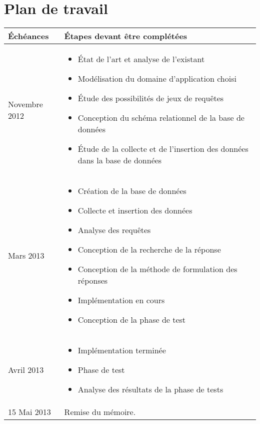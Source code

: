 \documentclass[a4paper,12pt]{article}
\begin{document}
\section{Plan de travail}
\begin{tabular}{p{4cm} p{9cm}}
  \toprule
  \large{Échéances} & \large{Étapes devant être complétées} \\
  \midrule
  \large{Novembre 2012} & \begin{itemize}
    \item État de l'art et analyse de l'existant
    \item Modélisation du domaine d'application choisi
    \item Étude des possibilités de jeux de requêtes
    \item Conception du schéma relationnel de la base de données
    \item Étude de la collecte et de l'insertion des données dans la base de données
  \end{itemize}
  \\
  \large{Mars 2013} & \begin{itemize}
    \item Création de la base de données
    \item Collecte et insertion des données
    \item Analyse des requêtes
    \item Conception de la recherche de la réponse
    \item Conception de la méthode de formulation des réponses
    \item Implémentation en cours
    \item Conception de la phase de test
  \end{itemize}
  \\
  \large{Avril 2013} & \begin{itemize}
    \item Implémentation terminée
    \item Phase de test
    \item Analyse des résultats de la phase de tests
  \end{itemize}
  \\
  \large{15 Mai 2013} & Remise du mémoire. \\
  \bottomrule
\end{tabular}
\end{document}
